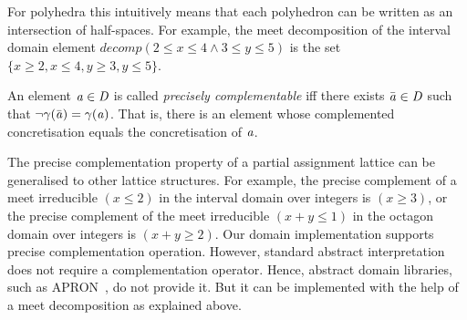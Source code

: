 \noindent For polyhedra this intuitively means that each polyhedron can be
written as an intersection of half-spaces.
%
For example, the meet decomposition of the interval domain element
$decomp(2\leq x\leq 4 \wedge 3\leq y\leq 5)$ is
the set $\{x\geq 2, x\leq 4, y\geq 3, y\leq 5\}$.
%
\begin{definition} 
An element $\mathit{a}\in \mathit{D}$ is called \emph{precisely complementable}
iff there exists $\bar{\mathit{a}} \in \mathit{D}$ such that 
$\neg\gamma(\bar{\mathit{a}})=\gamma(\mathit{a})$.
That is, there is an element whose complemented concretisation equals
the concretisation of $\mathit{a}$.
\end{definition}
%
The precise complementation property of a partial assignment lattice can
be generalised to other lattice structures. 
%
For example, the precise complement of a meet irreducible $(x \leq 2)$ in
the interval domain over integers is $(x \geq 3)$, or the precise complement
of the meet irreducible $(x+y \leq 1)$ in the octagon domain over integers
is $(x+y \geq 2)$.  Our domain implementation supports precise
complementation operation.  However, standard abstract interpretation does
not require a complementation operator.  Hence, abstract domain libraries,
such as APRON~\cite{apron}, do not provide it.  But it can be implemented
with the help of a meet decomposition as explained above.
%
